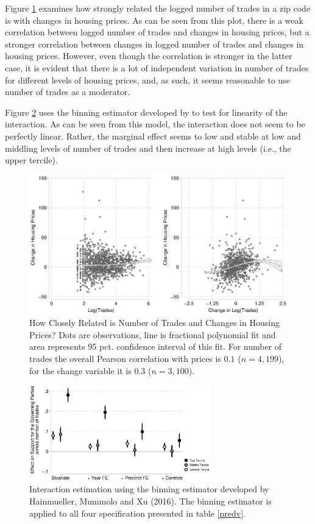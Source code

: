 \documentclass[12pt,a4paper]{article}
\begin{document}
	Figure \ref{scatter} examines how strongly related the logged number of trades in a zip code is with changes in housing prices. As can be seen from this plot, there is a weak correlation between logged number of trades and changes in housing prices, but a stronger correlation between changes in logged number of trades and changes in housing prices. However, even though the correlation is stronger in the latter case, it is evident that there is a lot of independent variation in number of trades for different levels of housing prices, and, as such, it seems reasonable to use number of trades as a moderator.
	
	Figure \ref{terciles} uses the binning estimator developed by \cite{hainmueller2016much} to test for linearity of the interaction. As can be seen from this model, the interaction does not seem to be perfectly linear. Rather, the marginal effect seems to low and stable at low and middling levels of number of trades and then increase at high levels (i.e., the upper tercile).
	
	\begin{figure}
		\includegraphics[width=1\textwidth]{../figures/corrmoderator.eps}
		\caption{How Closely Related is Number of Trades and Changes in Housing Prices? Dots are observations, line is fractional polynomial fit and area represents 95 pct. confidence interval of this fit. For number of trades the overall Pearson correlation with prices is $0.1$ ($n=4,199$), for the change variable it is $0.3$ ($n=3,100$). }
		\label{scatter}
	\end{figure}
	
	
	\begin{figure}
		\includegraphics[width=0.7\textwidth]{../figures/localactivity_sup.eps}
		
		\caption{Interaction estimation using the binning estimator developed by Hainmueller, Mummolo and Xu (2016). The binning estimator is applied to all four specification presented in table \ref{predv}. }
		\label{terciles}
	\end{figure}
	
\end{document}
